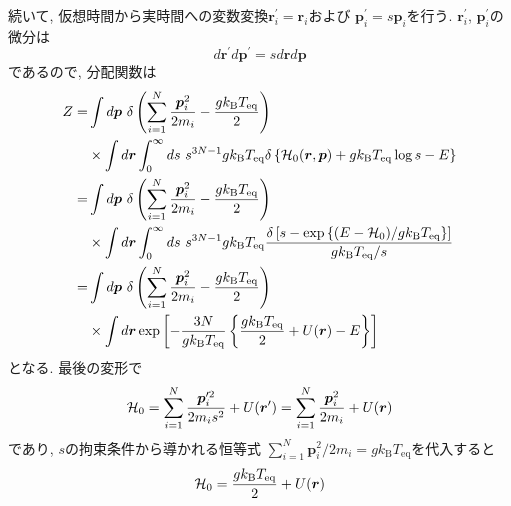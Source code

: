 続いて, 仮想時間から実時間への変数変換$\bm{r}_{i}^{\prime} = \bm{r}_{i}$および
$\bm{p}_{i}^{\prime} = s \bm{p}_{i}$を行う.
$\bm{r}_{i}^{\prime}$, $\bm{p}_{i}^{\prime}$の微分は
\begin{equation}
    d \bm{r}^{\prime} d \bm{p}^{\prime}
    =
    s d\bm{r} d \bm{p}
\end{equation}
であるので, 分配関数は
\begin{align}
    Z
    = &
    \int d\bm{p}~
    \delta
    \left(
        \sum_{i=1}^{N} \frac{\bm{p}_{i}^{2}}{2m_{i}}
        -
        \frac{g k_{\mathrm{B}} T_{\mathrm{eq}}}{2}
    \right)
    \notag \\
    &\times
    \int d\bm{r}
    \int_{0}^{\infty} ds~ s^{3N-1}
    g k_{\mathrm{B}} T_{\mathrm{eq}}
    \delta
    \left\{
        \mathcal{H}_{0}(\bm{r}, \bm{p})
        +
        g k_{\mathrm{B}} T_{\mathrm{eq}} \log s
        -
        E
    \right\}
    \notag \\
    = &
    \int d\bm{p}~
    \delta
    \left(
        \sum_{i=1}^{N} \frac{\bm{p}_{i}^{2}}{2m_{i}}
        -
        \frac{g k_{\mathrm{B}} T_{\mathrm{eq}}}{2}
    \right)
    \notag \\
    &\times
    \int d\bm{r}
    \int_{0}^{\infty} ds~ s^{3N-1}
    g k_{\mathrm{B}} T_{\mathrm{eq}}
    \frac
    {
        \delta
        \left[s - \exp\left\{(E-\mathcal{H}_{0})/g k_{\mathrm{B}} T_{\mathrm{eq}} \right\}\right]
    }
    {
        g k_{\mathrm{B}} T_{\mathrm{eq}} / s
    }
    \notag \\
    = &
    \int d\bm{p}~
    \delta
    \left(
        \sum_{i=1}^{N} \frac{\bm{p}_{i}^{2}}{2m_{i}}
        -
        \frac{g k_{\mathrm{B}} T_{\mathrm{eq}}}{2}
    \right)
    \notag \\
    &\times
    \int d\bm{r}
    \exp
    \left[
        -\frac{3N}{g k_{\mathrm{B}} T_{\mathrm{eq}}}
        \left\{
            \frac{g k_{\mathrm{B}} T_{\mathrm{eq}}}{2}
            +
            U(\bm{r})
            -
            E
        \right\}
    \right]
\end{align}
となる. 最後の変形で
\begin{equation}
    \mathcal{H}_{0}
    =
    \sum_{i=1}^{N}
    \frac{\bm{p}_{i}^{\prime 2}}{2 m_{i} s^{2}}
    +
    U(\bm{r}^{\prime})
    =
    \sum_{i=1}^{N}
    \frac{\bm{p}_{i}^{2}}{2m_{i}}
    +
    U(\bm{r})
    \notag
\end{equation}
であり, $s$の拘束条件から導かれる恒等式
$\sum_{i=1}^{N} \bm{p}_{i}^{2}/ 2m_{i} = g k_{\mathrm{B}} T_{\mathrm{eq}}$を代入すると
\begin{equation}
    \mathcal{H}_{0} = \frac{g k_{\mathrm{B}} T_{\mathrm{eq}}}{2} + U(\bm{r})
    \notag
\end{equation}
